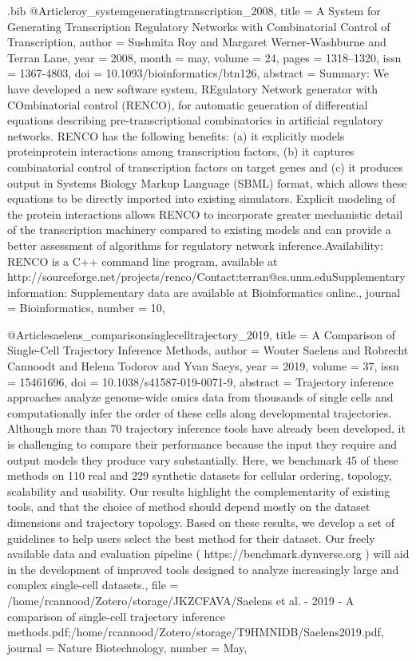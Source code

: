 \documentclass[
  table,
  10pt,
  a4paper]{article}
\begin{document}
\begin{filecontents}{\jobname.bib}
@Article{roy_systemgeneratingtranscription_2008,
	title = {A System for Generating Transcription Regulatory Networks with Combinatorial Control of Transcription},
	author = {Sushmita Roy and Margaret Werner-Washburne and Terran Lane},
	year = {2008},
	month = {may},
	volume = {24},
	pages = {1318--1320},
	issn = {1367-4803},
	doi = {10.1093/bioinformatics/btn126},
	abstract = {Summary: We have developed a new software system, REgulatory Network generator with COmbinatorial control (RENCO), for automatic generation of differential equations describing pre-transcriptional combinatorics in artificial regulatory networks. RENCO has the following benefits: (a) it explicitly models protein\textendash protein interactions among transcription factors, (b) it captures combinatorial control of transcription factors on target genes and (c) it produces output in Systems Biology Markup Language (SBML) format, which allows these equations to be directly imported into existing simulators. Explicit modeling of the protein interactions allows RENCO to incorporate greater mechanistic detail of the transcription machinery compared to existing models and can provide a better assessment of algorithms for regulatory network inference.Availability: RENCO is a C++ command line program, available at http://sourceforge.net/projects/renco/Contact:terran@cs.unm.eduSupplementary information: Supplementary data are available at Bioinformatics online.},
	journal = {Bioinformatics},
	number = {10},
}

@Article{saelens_comparisonsinglecelltrajectory_2019,
	title = {A Comparison of Single-Cell Trajectory Inference Methods},
	author = {Wouter Saelens and Robrecht Cannoodt and Helena Todorov and Yvan Saeys},
	year = {2019},
	volume = {37},
	issn = {15461696},
	doi = {10.1038/s41587-019-0071-9},
	abstract = {Trajectory inference approaches analyze genome-wide omics data from thousands of single cells and computationally infer the order of these cells along developmental trajectories. Although more than 70 trajectory inference tools have already been developed, it is challenging to compare their performance because the input they require and output models they produce vary substantially. Here, we benchmark 45 of these methods on 110 real and 229 synthetic datasets for cellular ordering, topology, scalability and usability. Our results highlight the complementarity of existing tools, and that the choice of method should depend mostly on the dataset dimensions and trajectory topology. Based on these results, we develop a set of guidelines to help users select the best method for their dataset. Our freely available data and evaluation pipeline ( https://benchmark.dynverse.org ) will aid in the development of improved tools designed to analyze increasingly large and complex single-cell datasets.},
	file = {/home/rcannood/Zotero/storage/JKZCFAVA/Saelens et al. - 2019 - A comparison of single-cell trajectory inference methods.pdf;/home/rcannood/Zotero/storage/T9HMNIDB/Saelens2019.pdf},
	journal = {Nature Biotechnology},
	number = {May},
}


\end{filecontents}
\end{document}
